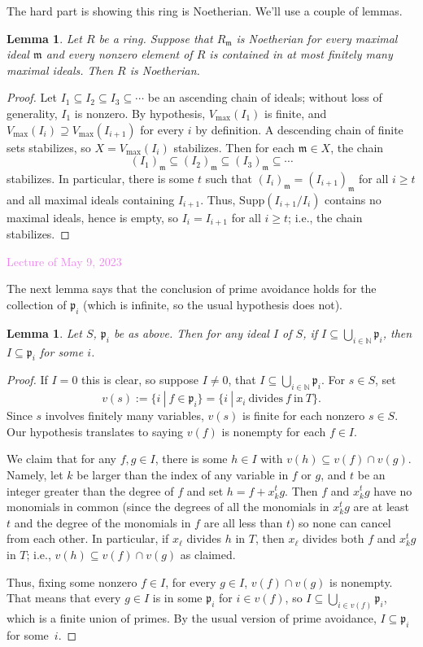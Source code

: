 \documentclass{amsart}[12pt]
\newcommand{\May}[1]{\textcolor{violet}{Lecture of May #1, 2023}}
\newcommand{\N}{\mathbb{N}}
\newcommand{\fp}{{\mathfrak p}}
\newcommand{\fm}{{\mathfrak m}}
\numberwithin{equation}{section}
\theoremstyle{plain} %
\newtheorem{lem}[equation]{Lemma}
\theoremstyle{definition}
\theoremstyle{remark}
\begin{document}
The hard part is showing this ring is Noetherian. We'll use a couple of lemmas.

\begin{lem} Let $R$ be a ring. Suppose that $R_\fm$ is Noetherian for every maximal ideal $\fm$ and every nonzero element of $R$ is contained in at most finitely many maximal ideals. Then $R$ is Noetherian.
\end{lem}
\begin{proof}
Let $I_1\subseteq I_2 \subseteq I_3 \subseteq \cdots$ be an ascending chain of ideals; without loss of generality, $I_1$ is nonzero. By hypothesis, $V_{\max}(I_1)$ is finite, and $V_{\max}(I_i) \supseteq V_{\max}(I_{i+1})$ for every $i$ by definition. A descending chain of finite sets stabilizes, so $X=V_{\max}(I_i)$ stabilizes.  Then for each $\fm\in X$, the chain 
\[(I_1)_{\fm} \subseteq (I_2)_{\fm} \subseteq (I_3)_{\fm} \subseteq \cdots\]
stabilizes. In particular, there is some $t$ such that $(I_i)_{\fm} = (I_{i+1})_{\fm}$ for all $i\geq t$ and all maximal ideals containing $I_{i+1}$. Thus, $\mathrm{Supp}(I_{i+1}/I_i)$ contains no maximal ideals, hence is empty, so $I_i=I_{i+1}$ for all $i\geq t$; i.e., the chain stabilizes.
\end{proof}

\May{9}

The next lemma says that the conclusion of prime avoidance holds for the collection of $\fp_i$ (which is infinite, so the usual hypothesis does not).

\begin{lem} Let $S$, $\fp_i$ be as above. Then for any ideal $I$ of $S$, if $I\subseteq \bigcup_{i\in \N} \fp_i$, then $I\subseteq \fp_i$ for some $i$.
\end{lem}
\begin{proof} If $I=0$ this is clear, so suppose $I\neq 0$, that $I\subseteq \bigcup_{i\in \N} \fp_i$.
For $s\in S$, set 
\[ v(s):=\{i \ | \ f\in \fp_i\}= \{ i \ | \ x_i \ \text{divides} \ f \ \text{in} \ T\}.\]
Since $s$ involves finitely many variables, $v(s)$ is finite for each nonzero $s\in S$. Our hypothesis translates to saying $v(f)$ is nonempty for each $f\in I$.

We claim that for any $f,g\in I$, there is some $h\in I$ with $v(h) \subseteq v(f) \cap v(g)$. Namely, let $k$ be larger than the index of any variable in $f$ or $g$, and $t$ be an integer greater than the degree of $f$ and set $h=f+x_k^t g$. Then $f$ and $x_k^t g$ have no monomials in common (since the degrees of all the monomials in $x_k^t g$ are at least $t$ and the degree of the monomials in $f$ are all less than $t$) so none can cancel from each other. In particular, if $x_\ell$ divides $h$ in $T$, then $x_\ell$  divides both $f$ and $x_k^t g$ in $T$; i.e., $v(h) \subseteq v(f) \cap v(g)$ as claimed.

Thus, fixing some nonzero $f\in I$, for every $g\in I$, $v(f) \cap v(g)$ is nonempty. That means that every $g\in I$ is in some $\fp_i$ for $i  \in v(f)$, so $I \subseteq \bigcup_{i\in v(f)} \fp_i$, which is a finite union of primes. By the usual version of prime avoidance, $I \subseteq \fp_i$ for some~$i$.
\end{proof}
\end{document}
